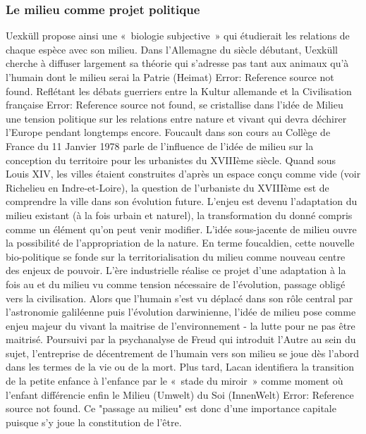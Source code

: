 \subsubsection[Le milieu comme projet politique]{Le milieu comme projet politique}
Uexküll propose ainsi une « biologie subjective » qui étudierait les relations de chaque espèce avec son milieu. Dans l’Allemagne du siècle débutant, Uexküll cherche à diffuser largement sa théorie qui s’adresse pas tant aux animaux qu’à l’humain dont le milieu serai la Patrie (Heimat) Error: Reference source not found. Reflétant les débats guerriers entre la Kultur allemande et la Civilisation française Error: Reference source not found, se cristallise dans l’idée de Milieu une tension politique sur les relations entre nature et vivant qui devra déchirer l’Europe pendant longtemps encore. Foucault dans son cours au Collège de France du 11 Janvier 1978 parle de l’influence de l’idée de milieu sur la conception du territoire pour les urbanistes du XVIIIème  siècle. Quand sous Louis XIV, les villes étaient construites d’après un espace conçu comme vide (voir Richelieu en Indre-et-Loire), la question de l’urbaniste du XVIIIème est de comprendre la ville dans son évolution future. L’enjeu est devenu l’adaptation du milieu existant (à la fois urbain et naturel), la transformation du donné compris comme un élément qu’on peut venir modifier. L’idée sous-jacente de milieu ouvre la possibilité de l’appropriation de la nature. En terme foucaldien, cette nouvelle bio-politique se fonde sur la territorialisation du milieu comme nouveau centre des enjeux de pouvoir.
L’ère industrielle réalise ce projet d’une adaptation à la fois au et du milieu vu comme tension nécessaire de l’évolution, passage obligé vers la civilisation. Alors que l’humain s’est vu déplacé dans son rôle central par l’astronomie galiléenne puis l’évolution darwinienne, l’idée de milieu pose comme enjeu majeur du vivant la maitrise de l’environnement - la lutte pour ne pas être maitrisé. Poursuivi par la psychanalyse de Freud qui introduit l’Autre au sein du sujet, l’entreprise de décentrement de l’humain vers son milieu se joue dès l’abord dans les termes de la vie ou de la mort. Plus tard, Lacan identifiera la transition de la petite enfance à l’enfance par le « stade du miroir » comme moment où l’enfant différencie enfin le Milieu (Umwelt) du Soi (InnenWelt) Error: Reference source not found. Ce "passage au milieu" est donc d’une importance capitale puisque s’y joue la constitution de l’être.

